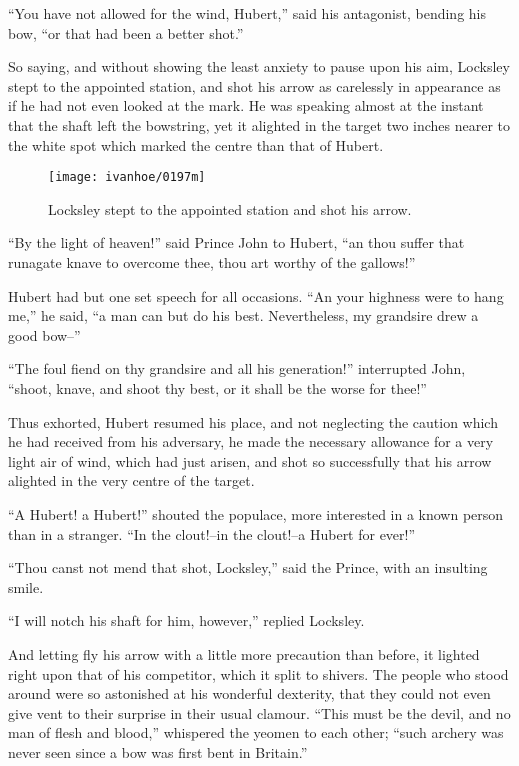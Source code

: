 ``You have not allowed for the wind, Hubert,'' said his antagonist,
bending his bow, ``or that had been a better shot.''

So saying, and without showing the least anxiety to pause upon his aim,
Locksley stept to the appointed station, and shot his arrow as
carelessly in appearance as if he had not even looked at the mark. He
was speaking almost at the instant that the shaft left the bowstring,
yet it alighted in the target two inches nearer to the white spot which
marked the centre than that of Hubert.

\begin{figure}
    \centering
    \texttt{[image: ivanhoe/0197m]}
    \caption{Locksley stept to the appointed station and shot his arrow.}
\end{figure}

``By the light of heaven!'' said Prince John to Hubert, ``an thou suffer
that runagate knave to overcome thee, thou art worthy of the gallows!''

Hubert had but one set speech for all occasions. ``An your highness were
to hang me,'' he said, ``a man can but do his best. Nevertheless, my
grandsire drew a good bow--''

``The foul fiend on thy grandsire and all his generation!'' interrupted
John, ``shoot, knave, and shoot thy best, or it shall be the worse for
thee!''

Thus exhorted, Hubert resumed his place, and not neglecting the caution
which he had received from his adversary, he made the necessary
allowance for a very light air of wind, which had just arisen, and shot
so successfully that his arrow alighted in the very centre of the
target.

``A Hubert! a Hubert!'' shouted the populace, more interested in a known
person than in a stranger. ``In the clout!--in the clout!--a Hubert for
ever!''

``Thou canst not mend that shot, Locksley,'' said the Prince, with an
insulting smile.

``I will notch his shaft for him, however,'' replied Locksley.

And letting fly his arrow with a little more precaution than before, it
lighted right upon that of his competitor, which it split to shivers.
The people who stood around were so astonished at his wonderful
dexterity, that they could not even give vent to their surprise in their
usual clamour. ``This must be the devil, and no man of flesh and
blood,'' whispered the yeomen to each other; ``such archery was never
seen since a bow was first bent in Britain.''

